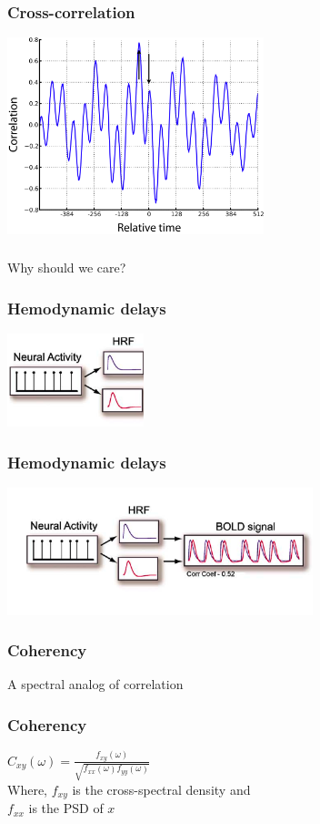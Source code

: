 \documentclass{beamer}
\begin{document}
\begin{frame}
\frametitle{Cross-correlation}
\includegraphics[height=5.7cm]{figures/outa_phase_xcorr_w_two_arrows}
\end{frame}

\begin{frame}
\frametitle{}
Why should we care? 
\end{frame}

\begin{frame}
\frametitle{Hemodynamic delays}
\includegraphics[height=2.7cm]{figures/hemo}
\end{frame}

\begin{frame}
\frametitle{Hemodynamic delays}
\includegraphics[height=3.7cm]{figures/tseries_w_hemo}
\end{frame}

\begin{frame}
\frametitle{Coherency}
A spectral analog of correlation
\end{frame}

\begin{frame}
\frametitle{Coherency}
$C_{xy}(\omega) = \frac{f_{xy}(\omega)}{\sqrt{f_{xx}(\omega)f_{yy}(\omega)}}$
\pause
\\
\vfill
Where, $f_{xy}$ is the cross-spectral density and 
\\
$f_{xx}$ is the PSD of $x$
\end{frame}
\end{document}
